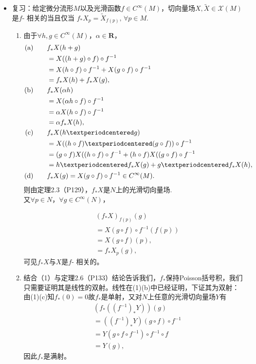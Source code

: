 \begin {itemize}
\item[5.]
    复习：给定微分流形$M$以及光滑函数$f \in C^\infty(M)$，切向量场$X,\tilde{X}\in \mathscr{X}(M)$是$f$- 相关的当且仅当
    $f_*X_p=\tilde{X}_{f(p)},\,\forall p \in M$.
	\begin{enumerate}
        \item[(1)]
        由于$\forall h,g \in C^\infty (M)$，$\alpha \in \mathbf{R}$，
        \begin{equation*} 
		\begin{split}
			(\textup{a})\qquad 
			&f_*X(h+g)\\
			& = X((h+g)\circ f)\circ f^{-1}\\
			& = X(h\circ f)\circ f^{-1}+X(g\circ f)\circ f^{-1} \\
			& = f_*X(h)+f_*X(g),\\
			(\textup{b})\qquad 
			&f_*X(\alpha h)\\
			& = X(\alpha h\circ f)\circ f^{-1}\\
			& = \alpha X( h\circ f)\circ f^{-1}\\
			& = \alpha f_*X( h),\\
			(\textup{c})\qquad 
			&f_*X(h·g)\\
			& = X((h\circ f)·(g\circ f))\circ f^{-1}\\
			& = (g\circ f)X((h\circ f)\circ f^{-1}+(h\circ f)X((g\circ f)\circ f^{-1} \\
			& = h· f_*X( g)+g·f_*X( h),\\
            (\textup{d})\qquad
            &f_*X(g)=X(g\circ f)\circ f^{-1}\in C^\infty(M).\\
		\end{split}
	\end{equation*} 
则由定理2.3（P129），$f_*X$是$N$上的光滑切向量场.\\
又$\forall p \in N$，$\forall g \in C^\infty (N)$，

\begin{equation*} 
	\begin{split}
		&(f_*X)_{f(p)}(g)\\
		& = X(g\circ f)\circ f^{-1}(f(p))\\
		& = X(g\circ f)(p), \\
        & = f_*X_p(g),
	\end{split}
\end{equation*} 
可见$f_*X$与$X$是$f$- 相关的。

\item[(2)]
结合（1）与定理2.6（P133）结论告诉我们，$f_*$保持Poisson括号积，我们只需要证明其是线性的双射。线性在(1)(b)中已经证明，下证其为双射：
\\
由(1)(c)知$f_*(0)=0$故$f_*$是单射，又对$N$上任意的光滑切向量场$Y$有
\begin{equation*} 
	\begin{split}
		&(f_*((f^{-1})_*Y))(g)\\
		& =((f^{-1})_*Y)(g\circ f)\circ f^{-1}\\
		& =Y(g\circ f\circ f^{-1})\circ f^{-1}\circ f\\
		& =Y(g),
	\end{split}
\end{equation*} 
因此$f_*$是满射。
\end{enumerate}


\end{itemize}
